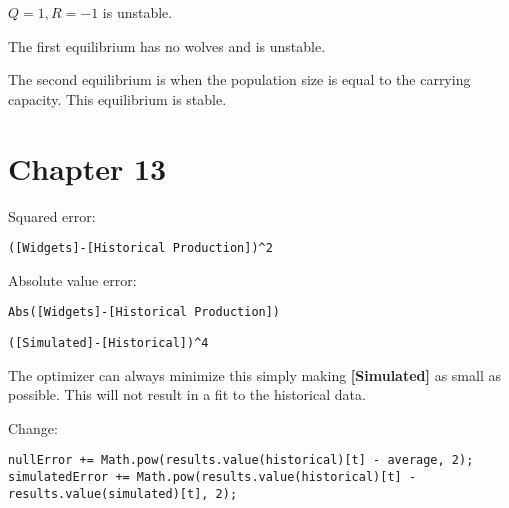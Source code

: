 \documentclass[]{memoir}
\newcommand{\p}[1]{\textbf{{[}#1{]}}}
\begin{document}
$Q=1, R=-1$ is unstable.


The first equilibrium has no wolves and is unstable.

The second equilibrium is when the population size is equal to the
carrying capacity. This equilibrium is stable.

\section{Chapter 13}


Squared error:

\lstinline!([Widgets]-[Historical Production])^2!

Absolute value error:

\lstinline!Abs([Widgets]-[Historical Production])!


\lstinline!([Simulated]-[Historical])^4!


The optimizer can always minimize this simply making \p{Simulated} as
small as possible. This will not result in a fit to the historical data.


Change:

\begin{lstlisting}
nullError += Math.pow(results.value(historical)[t] - average, 2);
simulatedError += Math.pow(results.value(historical)[t] - results.value(simulated)[t], 2);
\end{lstlisting}
\end{document}
